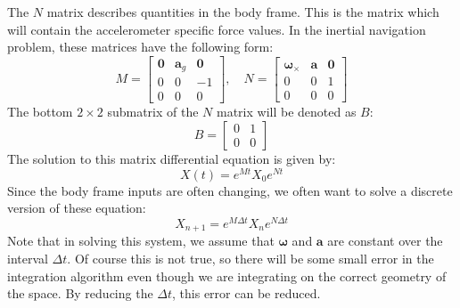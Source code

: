 The $N$ matrix describes quantities in the body frame. This is the matrix which will contain the accelerometer specific force values. In the inertial navigation problem, these matrices have the following form:
$$M=\begin{bmatrix}
\bm{0}&\bm{a}_g&\bm{0}\\
0&0&-1\\0&0&0
\end{bmatrix},\quad N=\begin{bmatrix}
\bm{\omega}_\times&\bm{a}&\bm{0}\\0&0&1\\0&0&0
\end{bmatrix}$$
The bottom $2\times2$ submatrix of the $N$ matrix will be denoted as $B$:
$$B=\begin{bmatrix}
    0&1\\0&0
\end{bmatrix}$$
The solution to this matrix differential equation is given by:
$$X(t)=e^{Mt}X_0e^{Nt}$$
Since the body frame inputs are often changing, we often want to solve a discrete version of these equation:
$$X_{n+1}=e^{M\Delta t}X_ne^{N\Delta t}$$
Note that in solving this system, we assume that $\bm{\omega}$ and $\bm{a}$ are constant over the interval $\Delta t$. Of course this is not true, so there will be some small error in the integration algorithm even though we are integrating on the correct geometry of the space. By reducing the $\Delta t$, this error can be reduced.

